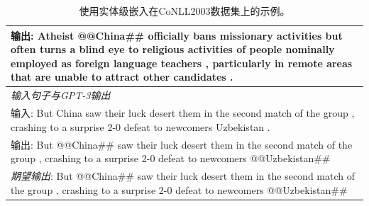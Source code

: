 \documentclass[supercite]{Experimental_Report}
\theoremstyle{definition}
\begin{document}
\begin{table}[th!]
{\begin{tabular}{l}
输出: Atheist @@China\#\# officially bans missionary activities but often turns a blind eye to religious activities of people nominally employed as foreign language teachers , particularly in remote areas that are unable to attract other candidates . \\\midrule
\textit{输入句子与GPT-3输出} \\
输入: But China saw their luck desert them in the second match of the group , crashing to a surprise 2-0 defeat to newcomers Uzbekistan . \\
输出: But @@China\#\# saw their luck desert them in the second match of the group , crashing to a surprise 2-0 defeat to newcomers @@Uzbekistan\#\# \\
{\color{blue}\it 期望输出}: But @@China\#\# saw their luck desert them in the second match of the group , crashing to a surprise 2-0 defeat to newcomers @@Uzbekistan\#\#  \\\bottomrule
    \end{tabular}
    }
     \caption{使用实体级嵌入在CoNLL2003数据集上的示例。}
    \label{tab:example_entity_level_embedding}
\end{table}


\end{document}
